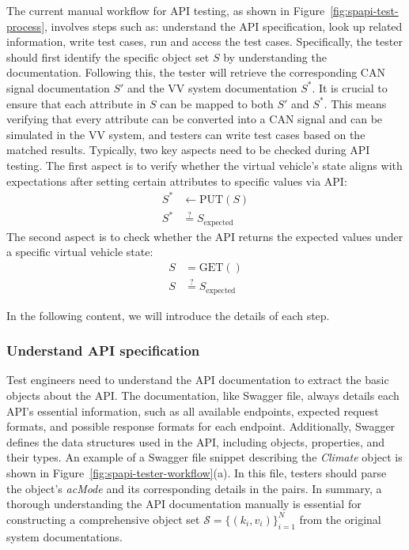 The current manual workflow for API testing, as shown in Figure~\ref{fig:spapi-test-process}, involves steps such as: understand the API specification, look up related information, write test cases, run and access the test cases. 
Specifically, the tester should first identify the specific object set \( S \) by understanding the documentation. Following this, the tester will retrieve the corresponding CAN signal documentation \( S' \) and the VV system documentation \( S^* \). It is crucial to ensure that each attribute in \( S \) can be mapped to both \( S' \) and \( S^* \). 
This means verifying that every attribute can be converted into a CAN signal and can be simulated in the VV system, and testers can write test cases based on the matched results.
Typically, two key aspects need to be checked during API testing. The first aspect is to verify whether the virtual vehicle's state aligns with expectations after setting certain attributes to specific values via API:
\begin{equation}
  \begin{aligned}
  S^{*} &\leftarrow \text{PUT}(S) \\
  S^{*} &\stackrel{?}{=} S_\text{expected}
\end{aligned}
\end{equation}
The second aspect is to check whether the API returns the expected values under a specific virtual vehicle state:
\begin{equation}
  \begin{aligned}
    S &= \text{GET}() \\
    S &\stackrel{?}{=} S_\text{expected}
\end{aligned}
\end{equation}

In the following content, we will introduce the details of each step. 

\subsubsection{Understand API specification} 
Test engineers need to understand the API documentation to extract the basic objects about the API. The documentation, like Swagger file, always details each API's essential information, such as all available endpoints, expected request formats, and possible response formats for each endpoint. 
Additionally, Swagger defines the data structures used in the API, including objects, properties, and their types.
An example of a Swagger file snippet describing the \textit{Climate} object is shown in Figure~\ref{fig:spapi-tester-workflow}(a).
In this file, testers should parse the object's \textit{acMode} and its corresponding details in the pairs. 
In summary, a thorough understanding the API documentation manually is essential for constructing a comprehensive object set $\mathcal{S} = \{(k_i, v_i)\}_{i=1}^N$ from the original system documentations.


